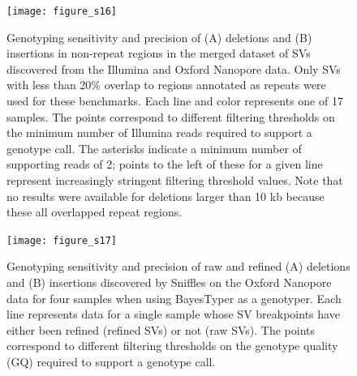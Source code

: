 \documentclass[12pt]{article}
\newenvironment{lsfigure}
	{\begin{landscape} \begin{figure} \centering}
	{\end{figure} \end{landscape}}
\begin{document}
\begin{lsfigure}
	\texttt{[image: figure\_s16]}

	\caption[Sensitivity and precision of joint Illumina/Oxford Nanopore deletion and insertion genotyping in non-repeat regions]{
		Genotyping sensitivity and precision of (A) deletions and (B) insertions in non-repeat regions in the merged dataset of SVs discovered from the Illumina and Oxford Nanopore data. 
		Only SVs with less than 20\% overlap to regions annotated as repeats were used for these benchmarks. 
		Each line and color represents one of 17 samples. 
		The points correspond to different filtering thresholds on the minimum number of Illumina reads required to support a genotype call.
		The asterisks indicate a minimum number of supporting reads of 2; points to the left of these for a given line represent increasingly stringent filtering threshold values.
		Note that no results were available for deletions larger than 10 kb because these all overlapped repeat regions.
	}

	\label{fig_s16}
\end{lsfigure}

\clearpage%

\begin{lsfigure}
	\texttt{[image: figure\_s17]}

	\caption[Genotyping sensitivity of raw and refined Oxford Nanopore SVs for four samples using BayesTyper]{
		Genotyping sensitivity and precision of raw and refined (A) deletions and (B) insertions discovered by Sniffles on the Oxford Nanopore data for four samples when using BayesTyper as a genotyper.
		Each line represents data for a single sample whose SV breakpoints have either been refined (refined SVs) or not (raw SVs).
		The points correspond to different filtering thresholds on the genotype quality (GQ) required to support a genotype call.
	}

	\label{fig_s17}

\end{lsfigure}

\clearpage%
\end{document}
